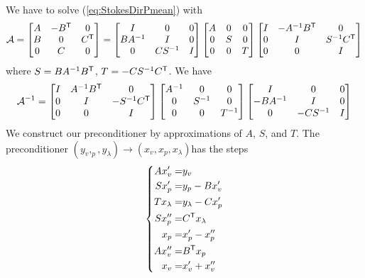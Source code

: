 We have to solve (\ref{eq:StokesDirPmean}) with 
%
\begin{align*}
\mathcal A = 
\begin{bmatrix}
A  & -{B}^{\mathsf{T}}& 0\\
B & 0 & {C}^{\mathsf{T}}\\
0 & C & 0
\end{bmatrix}
=
\begin{bmatrix}
I  & 0& 0\\
BA^{-1} & I & 0\\
0 & CS^{-1} & I
\end{bmatrix}
\begin{bmatrix}
A  & 0& 0\\
0 & S & 0\\
0 & 0 & T
\end{bmatrix}
\begin{bmatrix}
I  & -A^{-1}{B}^{\mathsf{T}}& 0\\
0 & I & S^{-1}{C}^{\mathsf{T}}\\
0 & 0 & I
\end{bmatrix}
\end{align*}
%
where $S=BA^{-1}{B}^{\mathsf{T}}$, $T=-CS^{-1}{C}^{\mathsf{T}}$. We have
%
\begin{align*}
\mathcal A^{-1} = 
\begin{bmatrix}
I  & A^{-1}{B}^{\mathsf{T}}& 0\\
0 & I & -S^{-1}{C}^{\mathsf{T}}\\
0 & 0 & I
\end{bmatrix}
\begin{bmatrix}
A^{-1}  & 0& 0\\
0 & S^{-1} & 0\\
0 & 0 & T^{-1}
\end{bmatrix}
\begin{bmatrix}
I  & 0& 0\\
-BA^{-1} & I & 0\\
0 & -CS^{-1} & I
\end{bmatrix}
\end{align*}
%
We construct our preconditioner by approximations of $A$, $S$, and $T$. The preconditioner $(y_v,_p,y_{\lambda})\to(x_v,x_p,x_{\lambda})$has the steps
%
\begin{align*}
%
\left\{
\begin{aligned}
A {x_v'} =& y_v\\
S {x_p'} =& y_p - B {x_v'}\\
T x_{\lambda} =& y_{\lambda} - C {x_p'}\\
S x_p'' =& \transpose{C} x_{\lambda}\\
{x_p} =& {x_p'} - x_p''\\
A x_v'' =& \transpose{B} x_p\\
x_v =& x_v' + x_v''
\end{aligned}
\right.
%
\end{align*}
%

%
%
\printbibliography[title=References Section~\thesection]
